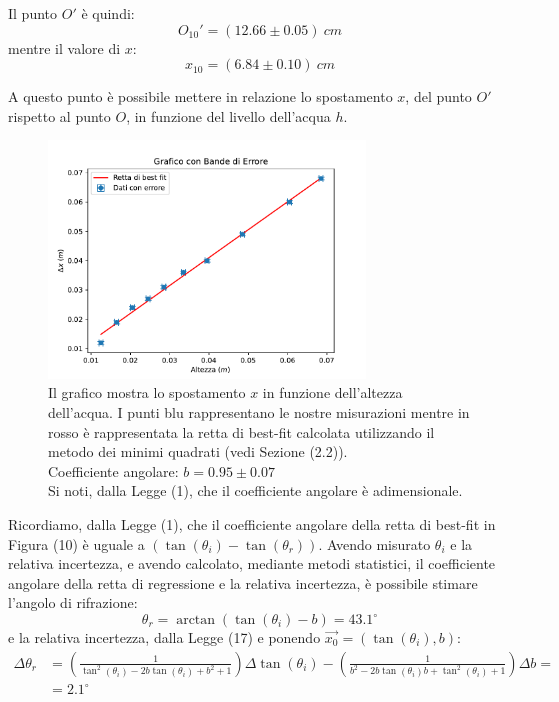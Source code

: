 Il punto $O'$ è quindi:
\begin{equation}
	O_{10}'=(12.66\pm0.05)\ cm
\end{equation}
mentre il valore di $x$:
\begin{equation}
	x_{10}=(6.84\pm 0.10)\ cm
\end{equation}
 
A questo punto è possibile mettere in relazione lo spostamento $x$, del punto $O'$ rispetto al punto $O$, in funzione del livello dell'acqua $h$. 
 
\begin{figure}[H]
	\centering
	\includegraphics[width=0.75\textwidth]{./figures/grafico1}
	\caption{Il grafico mostra lo spostamento $x$ in funzione dell'altezza dell'acqua. I punti blu rappresentano le nostre misurazioni mentre in rosso è rappresentata la retta di best-fit calcolata utilizzando il metodo dei minimi quadrati (vedi Sezione (2.2)).\\
	Coefficiente angolare: $b=0.95\pm 0.07$\\
	Si noti, dalla Legge (1), che il coefficiente angolare è adimensionale.}
\end{figure} 

Ricordiamo, dalla Legge (1), che il coefficiente angolare della retta di best-fit in Figura (10) è uguale a $(\tan(\theta_i)-\tan(\theta_r))$. Avendo misurato $\theta_i$ e la relativa incertezza, e avendo calcolato, mediante metodi statistici, il coefficiente angolare della retta di regressione e la relativa incertezza, è possibile stimare l'angolo di rifrazione:
\begin{equation}
	\theta_r=\arctan(\tan(\theta_i)-b)=43.1^{\circ}
\end{equation}
e la relativa incertezza, dalla Legge (17) e ponendo $\vec{x_0} = (\tan(\theta_i),b)$:
\begin{align}
	\Delta \theta_r&=\left(\frac{1}{\tan^2(\theta_i)-2b\tan(\theta_i)+b^2+1}\right)\Delta \tan(\theta_i) - \left(\frac{1}{b^2-2b\tan(\theta_i)b+\tan^2(\theta_i)+1}\right)\Delta b= \\
    &=2.1^{\circ}
\end{align}



